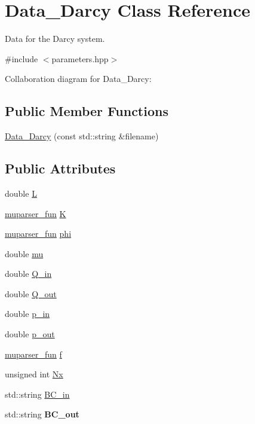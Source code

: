 \hypertarget{classData__Darcy}{}\section{Data\+\_\+\+Darcy Class Reference}
\label{classData__Darcy}


Data for the Darcy system.  




{\ttfamily \#include $<$parameters.\+hpp$>$}



Collaboration diagram for Data\+\_\+\+Darcy\+:
\subsection*{Public Member Functions}
\begin{DoxyCompactItemize}
\item 
\hyperlink{classData__Darcy_a6941ffb73d1eb40f2d21e4a50f23567c}{Data\+\_\+\+Darcy} (const std\+::string \&filename)
\end{DoxyCompactItemize}
\subsection*{Public Attributes}
\begin{DoxyCompactItemize}
\item 
double \hyperlink{classData__Darcy_a9a09be5df0d4a24091f0600aa7583edd}{L}
\item 
\hyperlink{classmuparser__fun}{muparser\+\_\+fun} \hyperlink{classData__Darcy_acde360b15a8f19205ef8bdc6221c7ef1}{K}
\item 
\hyperlink{classmuparser__fun}{muparser\+\_\+fun} \hyperlink{classData__Darcy_a2838fcf94c2a9e3ae7fa234964d63b47}{phi}
\item 
double \hyperlink{classData__Darcy_a1873e9645090a2a2cc2b4136e2cbd9c7}{mu}
\item 
double \hyperlink{classData__Darcy_a0b571112f2b3767a50d6c9ee5d9b64f2}{Q\+\_\+in}
\item 
double \hyperlink{classData__Darcy_a904d9b426d753e4a8b61599c2aac0afd}{Q\+\_\+out}
\item 
double \hyperlink{classData__Darcy_a4c9aef907e96d72e9d75e4d9a69bd8c0}{p\+\_\+in}
\item 
double \hyperlink{classData__Darcy_a0c67d809cec0e3a70fa8103e1727b3d5}{p\+\_\+out}
\item 
\hyperlink{classmuparser__fun}{muparser\+\_\+fun} \hyperlink{classData__Darcy_a3798aaae34aca37298c0b02d6e235a8a}{f}
\item 
unsigned int \hyperlink{classData__Darcy_a5bdb5c38b6f66e242b6b9ab723def8f0}{Nx}
\item 
std\+::string \hyperlink{classData__Darcy_ae3db5526192e3622b48979dfe8f89d09}{B\+C\+\_\+in}
\item 
\mbox{\label{classData__Darcy_a40764c9d9aa12630861aab5765d3a9f7}} 
std\+::string {\bfseries B\+C\+\_\+out}
\end{DoxyCompactItemize}



